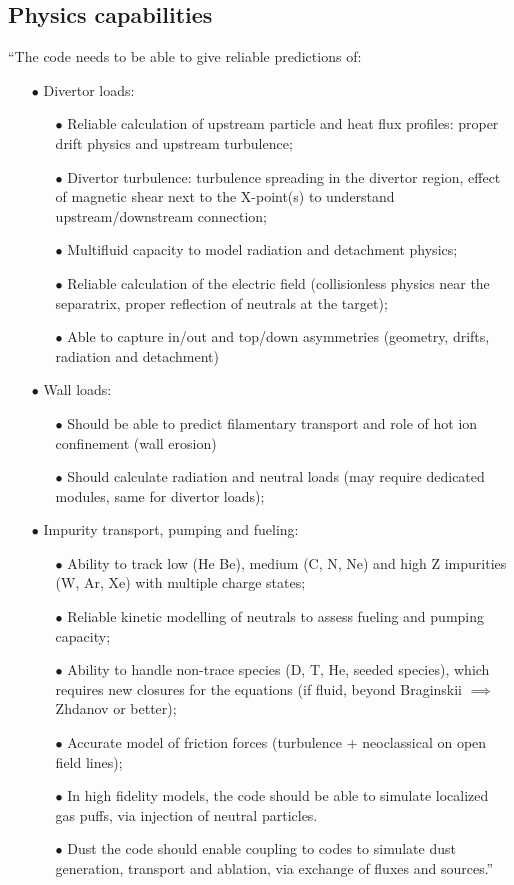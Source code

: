 \subsection{Physics capabilities}
\label{sec:physics_capabilities}

``The code needs to be able to give reliable predictions of:
\begin{itemize}
\item[$\bullet$] Divertor loads:
\begin{itemize}
\item[$\bullet$] Reliable calculation of upstream particle and heat flux
	profiles: proper drift physics and upstream turbulence;
\item[$\bullet$] Divertor turbulence: turbulence spreading in the divertor
	region, effect of magnetic shear next to the X-point(s) to understand
	upstream/downstream connection;
\item[$\bullet$] Multifluid capacity to model radiation and detachment physics;
\item[$\bullet$] Reliable calculation of the electric field (collisionless
	physics near the separatrix, proper reflection of neutrals at the
	target);
\item[$\bullet$] Able to capture in/out and top/down asymmetries (geometry,
	drifts, radiation and detachment)
\end{itemize}
\item[$\bullet$] Wall loads:
\begin{itemize}
\item[$\bullet$] Should be able to predict filamentary transport and role of
	hot ion confinement (wall erosion)
\item[$\bullet$] Should calculate radiation and neutral loads (may require
	dedicated modules, same for divertor loads);
\end{itemize}
\item[$\bullet$] Impurity transport, pumping and fueling:
\begin{itemize}
\item[$\bullet$] Ability to track low (He Be), medium (C, N, Ne) and high Z
	impurities (W, Ar, Xe) with multiple charge states;
\item[$\bullet$] Reliable kinetic modelling of neutrals to assess fueling and
	pumping capacity;
\item[$\bullet$] Ability to handle non-trace species (D, T, He, seeded
	species), which requires new closures for the equations (if fluid,
	beyond Braginskii $\implies$ Zhdanov or better);
\item[$\bullet$] Accurate model of friction forces (turbulence + neoclassical
	on open field lines);
\item[$\bullet$] In high fidelity models, the code should be able to simulate
	localized gas puffs, via injection of neutral particles.
\item[$\bullet$] Dust  the code should enable coupling to codes to simulate
	dust generation, transport and ablation, via exchange of fluxes and
	sources.''
\end{itemize}
\end{itemize}



